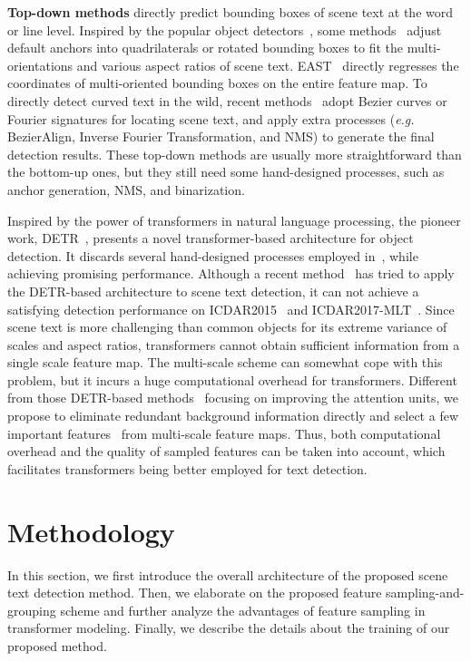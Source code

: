\documentclass[10pt,twocolumn,letterpaper]{article}
\begin{document}
\textbf{Top-down methods} directly predict bounding boxes of scene text at the word or line level.
Inspired by the popular object detectors~\cite{SSD,faster-rcnn}, some methods~\cite{TextBoxes,textboxes++,RRPN} adjust default anchors into quadrilaterals or rotated bounding boxes to fit the multi-orientations and various aspect ratios of scene text.
EAST~\cite{EAST} directly regresses the coordinates of multi-oriented bounding boxes on the entire feature map.
To directly detect curved text in the wild, recent methods~\cite{abcnet,fourier} adopt Bezier curves or Fourier signatures for locating scene text, and apply extra processes (\emph{e.g.} BezierAlign, Inverse Fourier Transformation, and NMS) to generate the final detection results.
These top-down methods are usually more straightforward than the bottom-up ones, but they still need some hand-designed processes, such as anchor generation, NMS, and binarization.


Inspired by the power of transformers in natural language processing, the pioneer work, DETR~\cite{carion2020detr}, presents a novel transformer-based architecture for object detection.
It discards several hand-designed processes employed in~\cite{faster-rcnn, SSD, mask-rcnn}, while achieving promising performance.
Although a recent method~\cite{raisi2021transformer} has tried to apply the DETR-based architecture to scene text detection, it can not achieve a satisfying detection performance on ICDAR2015~\cite{ic15} and ICDAR2017-MLT~\cite{MLT17}.
Since scene text is more challenging than common objects for its extreme variance of scales and aspect ratios, transformers cannot obtain sufficient information from a single scale feature map.
The multi-scale scheme can somewhat cope with this problem, but it incurs a huge computational overhead for transformers.
Different from those DETR-based methods~\cite{zhu2020deformable,meng2021conditional} focusing on improving the attention units, we propose to eliminate redundant background information directly and select a few important features~\cite{zhou2002ensembling} from multi-scale feature maps.
Thus, both computational overhead and the quality of sampled features can be taken into account, which facilitates transformers being better employed for text detection.





\section{Methodology}
\label{sec:method}
In this section, we first introduce the overall architecture of the proposed scene text detection method.
Then, we elaborate on the proposed feature sampling-and-grouping scheme and further analyze the advantages of feature sampling in transformer modeling.
Finally, we describe the details about the training of our proposed method.
\end{document}
